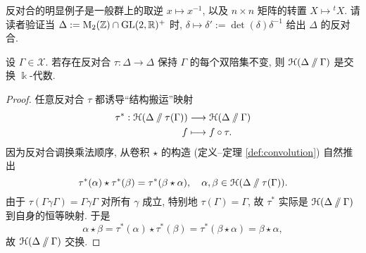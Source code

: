 \begin{example}
	反对合的明显例子是一般群上的取逆 $x \mapsto x^{-1}$, 以及 $n \times n$ 矩阵的转置 $X \mapsto {}^t X$. 请读者验证当 $\Delta := \operatorname{M}_2(\mathbb{Z}) \cap \operatorname{GL}(2,\mathbb{R})^+$ 时, $\delta \mapsto \delta' := \det(\delta)\delta^{-1}$ 给出 $\Delta$ 的反对合.
\end{example}

\begin{theorem}\label{prop:Hecke-comm-criterion}
	设 $\Gamma \in \mathcal{X}$. 若存在反对合 $\tau: \Delta \to \Delta$ 保持 $\Gamma$ 的每个双陪集不变, 则 $\EuScript{H}(\Delta \sslash \Gamma)$ 是交换 $\Bbbk$-代数.
\end{theorem}
\begin{proof}
	任意反对合 $\tau$ 都诱导``结构搬运''映射
	\begin{align*}
		\tau^*: \EuScript{H}(\Delta \sslash \tau(\Gamma)) & \longrightarrow \EuScript{H}(\Delta \sslash \Gamma) \\
		f & \longmapsto f \circ \tau.
	\end{align*}
	因为反对合调换乘法顺序, 从卷积 $\star$ 的构造 (定义--定理 \ref{def:convolution}) 自然推出
	\[ \tau^*(\alpha) \star \tau^*(\beta) = \tau^*(\beta \star \alpha), \quad \alpha, \beta \in \EuScript{H}(\Delta \sslash \tau(\Gamma)). \]
	由于 $\tau(\Gamma \gamma \Gamma) = \Gamma\gamma\Gamma$ 对所有 $\gamma$ 成立, 特别地 $\tau(\Gamma) = \Gamma$, 故 $\tau^*$ 实际是 $\EuScript{H}(\Delta \sslash \Gamma)$ 到自身的恒等映射. 于是
	\[ \alpha \star \beta = \tau^*(\alpha) \star \tau^*(\beta) = \tau^*(\beta \star \alpha) = \beta \star \alpha, \]
	故 $\EuScript{H}(\Delta \sslash \Gamma)$ 交换.
\end{proof}


